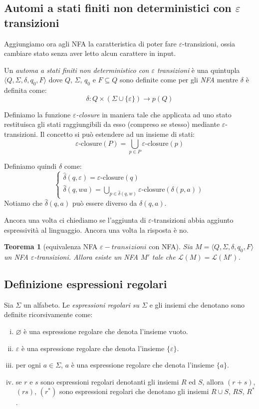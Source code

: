 \documentclass[a4paper,titlepage]{article}
\newtheorem{theorem}{Teorema}[section]
\theoremstyle{definition}
\newcommand{\DFA}{\langle Q,\Sigma,\delta,q_0,F\rangle}
\begin{document}
\subsection{Automi a stati finiti non deterministici con $\varepsilon$ transizioni}
Aggiungiamo ora agli NFA la caratteristica di poter fare $\varepsilon$-transizioni, ossia cambiare stato senza aver letto alcun carattere in input. 

Un \textit{automa a stati finiti non deterministico con $\varepsilon$ transizioni} è una quintupla $\DFA$ dove $Q$, $\Sigma$, $q_0$ e $F \subseteq Q$ sono definite come per gli \textit{NFA} mentre $\delta$ è definita come:
\[
	\delta: Q\times (\Sigma \cup \{\varepsilon\})\to p(Q)
\]


Definiamo la funzione \textit{$\varepsilon$-closure} in maniera tale che applicata ad uno stato restituisca gli stati raggiungibili da esso (compreso se stesso) mediante $\varepsilon$-transizioni. Il concetto si può estendere ad un insieme di stati: 
\[
	\varepsilon\text{-closure}(P) = \bigcup_{p \in P} \varepsilon\text{-closure}(p)
\]

Definiamo quindi $\hat\delta$ come:
\[
	\begin{cases} 
		\hat\delta(q, \varepsilon) = \varepsilon\text{-closure}(q)\\
		\hat\delta(q, wa) = \bigcup_{p \in \hat\delta(q, w)}  \varepsilon\text{-closure}(\delta(p, a))
	\end{cases}
\]
Notiamo che $\hat\delta(q,a)$ può essere diverso da $\delta(q, a)$.

Ancora una volta ci chiediamo se l'aggiunta di $\varepsilon$-transizioni abbia aggiunto espressività al linguaggio. Ancora una volta la risposta è no.
\begin{theorem}[equivalenza NFA $\varepsilon-transizioni$ con NFA]
	Sia $M = \DFA$ un NFA $\varepsilon$-transizioni. Allora esiste un NFA $M'$ tale che $\mathcal L(M) = \mathcal L(M')$.
\end{theorem}


\subsection{Definizione espressioni regolari}
Sia $\Sigma$ un alfabeto. Le \textit{espressioni regolari su $\Sigma$} e gli insiemi che denotano sono definite ricorsivamente come:
\begin{enumerate}[(i)]
	\item $\varnothing$ è una espressione regolare che denota l'insieme vuoto.
	\item $\varepsilon$ è una espressione regolare che denota l'insieme $\{\varepsilon\}$.
	\item per ogni $a\in\Sigma$, $a$ è una espressione regolare che denota l'insieme $\{a\}$.
	\item se $r$ e $s$ sono espressioni regolari denotanti gli insiemi $R$ ed $S$, allora $(r+s)$, $(rs)$, $(r^*)$ sono espressioni regolari che denotano gli insiemi $R\cup S$, $RS$, $R^*$.
\end{enumerate} 
\end{document}
